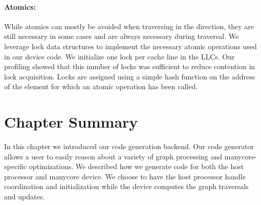 \paragraph{Atomics:}
While atomics can mostly be avoided when traversing in the \pull direction, they are still necessary in some cases and are always necessary during \push traversal.
We leverage lock data structures to implement the necessary atomic operations used in our device code.
We initialize one lock per cache line in the LLCs.
Our profiling showed that this number of locks was sufficient to reduce contention in lock acquisition.
Locks are assigned using a simple hash function on the address of the element for which an atomic operation has been called.

\section{Chapter Summary}
In this chapter we introduced our \hb code generation backend.
Our code generator allows a user to easily reason about a variety of graph processing and manycore-specific optimizations.
We described how we generate code for both the host processor and manycore device. 
We choose to have the host processor handle coordination and initialization while the device computes the graph traversals and updates.